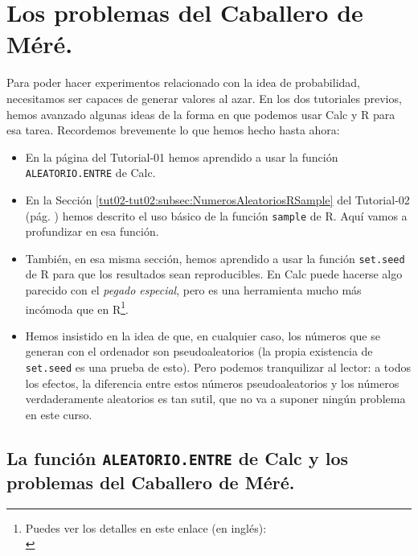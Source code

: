 \documentclass[10pt,a4paper]{article}\usepackage[]{graphicx}\usepackage[]{color}
\begin{document}
\section{Los problemas del Caballero de Méré.}
\label{tut03:sec:NumerosAleatoriosRSample}

Para poder hacer experimentos relacionado con la idea de probabilidad, necesitamos ser capaces de generar valores al azar. En los dos tutoriales previos, hemos avanzado algunas ideas de la forma en que podemos usar Calc y R para esa tarea. Recordemos brevemente lo que hemos hecho hasta ahora:
     
     \begin{itemize}
\item En la página \pageref{tut01-tut01:subsubsec:NumerosAleatoriosCalc} del Tutorial-01 hemos aprendido a usar la función {\tt ALEATORIO.ENTRE} de Calc.
\item En la Sección \ref{tut02-tut02:subsec:NumerosAleatoriosRSample} del Tutorial-02 (pág. \pageref{tut02-tut02:subsec:NumerosAleatoriosRSample}) hemos descrito el uso básico de la función {\tt sample} de R. Aquí vamos a profundizar en esa función.
\item También, en esa misma sección, hemos aprendido a usar la función {\tt set.seed} de R para que los resultados sean reproducibles. En Calc puede hacerse algo parecido con el {\em pegado especial}, pero es una herramienta mucho más incómoda que en R\footnote{Puedes ver los detalles en este enlace (en inglés):\\ }.
\item Hemos insistido en la idea de que, en cualquier caso, los números que se generan con el ordenador son pseudoaleatorios (la propia existencia de {\tt set.seed} es una prueba de esto). Pero podemos tranquilizar al lector: a todos los efectos, la diferencia entre estos números pseudoaleatorios y los números verdaderamente aleatorios es tan sutil, que no va a suponer ningún problema en este curso.
\end{itemize}

\subsection{La función {\tt ALEATORIO.ENTRE} de Calc y los problemas del Caballero de Méré.}
\end{document}
